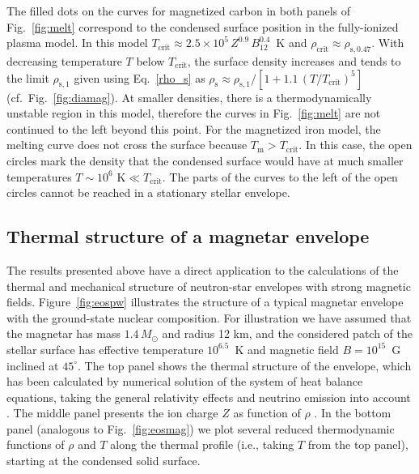 \documentclass[traditabstract]{aa}
\newcommand{\req}[1]{Eq.~\ref{#1}}
\newcommand{\rhos}{\rho_\mathrm{s}}
\newcommand{\Tm}{T_\mathrm{m}}
\begin{document}
The filled dots on the curves for magnetized carbon in both
panels of Fig.~\ref{fig:melt} correspond to the condensed
surface position in the fully-ionized plasma model.
In this model
$T_\mathrm{crit}\approx2.5\times10^5\,Z^{0.9}\,B_{12}^{0.4}$~K
and $\rho_\mathrm{crit} \approx \rho_\mathrm{s,0.47}$. With
decreasing temperature $T$ below $T_\mathrm{crit}$, the
surface density increases and tends to the limit 
$\rho_\mathrm{s,1}$ given using \req{rho_s} as 
$
   \rhos \approx \rho_\mathrm{s,1}
   / [1+1.1\,(T/T_\mathrm{crit})^5]
$
(cf.~Fig.~\ref{fig:diamag}).
At
smaller densities, there is a thermodynamically unstable
region in this model, therefore the curves 
in Fig.~\ref{fig:melt} are not continued
to the left beyond this point. For the magnetized iron
model, the melting curve does not cross the surface
because $\Tm>T_\mathrm{crit}$. In this case, the open
circles mark the density that the condensed surface would
have at much smaller temperatures $T\sim10^6\mbox{~K}\ll
T_\mathrm{crit}$. The parts of the curves to the left of the
open circles cannot be reached in a stationary stellar
envelope. 

\subsection{Thermal structure of a magnetar envelope}

The results presented above have a direct application to the
calculations of the thermal and mechanical structure of
neutron-star envelopes with strong magnetic fields.
Figure~\ref{fig:eospw} illustrates the structure of a
typical magnetar envelope with the ground-state nuclear
composition. For illustration we have assumed that the
magnetar has mass $1.4\,M_\odot$ and radius 12 km, 
and the considered patch of the stellar surface has
effective
temperature $10^{6.5}$~K and magnetic
field $B=10^{15}$~G inclined at $45^\circ$.
The top panel shows the thermal structure of the envelope,
which has been calculated by numerical solution of the
system of heat balance equations, taking the general
relativity effects and neutrino emission into account
\citep{PCY}. The middle panel presents the ion charge $Z$ as
function of $\rho$ \citep{Ruester}. In the bottom panel
(analogous to Fig.~\ref{fig:eosmag}) we plot several reduced
thermodynamic functions of $\rho$ and $T$ along the thermal
profile (i.e., taking $T$ from the top
panel), starting at the condensed solid surface.
\end{document}
